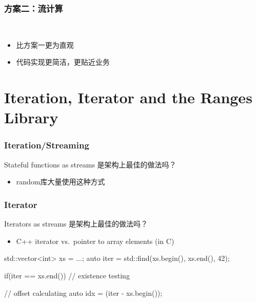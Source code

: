 \documentclass[UTF8,lualatex]{ctexbeamer}
\begin{document}
\begin{frame}
    \frametitle{方案二：流计算}
    \begin{block}{~}
        \begin{itemize}
            \item 比方案一更为直观
            \item 代码实现更简洁，更贴近业务
        \end{itemize}
    \end{block}
\end{frame}


\section{Iteration, Iterator and the Ranges Library}

\begin{frame}
    \frametitle{Iteration/Streaming}
    \begin{block}{Stateful functions as streams}
        是架构上最佳的做法吗？
        \begin{itemize}
            \item random库大量使用这种方式
        \end{itemize}
    \end{block}
\end{frame}


\begin{frame}[fragile]
    \frametitle{Iterator}
    \begin{block}{Iterators as streams}
        是架构上最佳的做法吗？
        \begin{itemize}
            \item C++ iterator vs.\ pointer to array elements (in C)
        \end{itemize}
    \end{block}
    \scriptsize
    \begin{cppcode}
        std::vector<int> xs = {...};
        auto iter = std::find(xs.begin(), xs.end(), 42);

        if(iter == xs.end()) {
            // existence testing
        }

        // offset calculating
        auto idx = (iter - xs.begin());
    \end{cppcode}
\end{frame}
\end{document}
